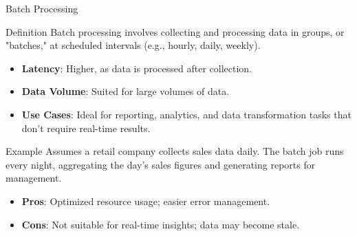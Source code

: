 \documentclass[aspectratio=169]{beamer}
\begin{document}
\begin{frame}[fragile]{Batch Processing}
    \begin{block}{Definition}
        Batch processing involves collecting and processing data in groups, or "batches," at scheduled intervals (e.g., hourly, daily, weekly).
    \end{block}
    
    \begin{itemize}
        \item \textbf{Latency}: Higher, as data is processed after collection.
        \item \textbf{Data Volume}: Suited for large volumes of data.
        \item \textbf{Use Cases}: Ideal for reporting, analytics, and data transformation tasks that don't require real-time results.
    \end{itemize}
    
    \begin{block}{Example}
        Assumes a retail company collects sales data daily. The batch job runs every night, aggregating the day's sales figures and generating reports for management.
    \end{block}
    
    \begin{itemize}
        \item \textbf{Pros}: Optimized resource usage; easier error management.
        \item \textbf{Cons}: Not suitable for real-time insights; data may become stale.
    \end{itemize}
\end{frame}
\end{document}

